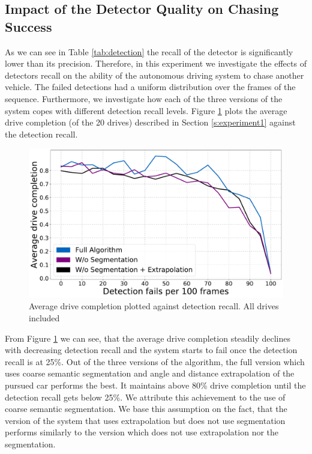 \documentclass{ctuthesis/ctuthesis}
\begin{document}
\subsection{Impact of the Detector Quality on Chasing Success}
As we can see in Table \ref{tab:detection} the recall of the detector is significantly lower than its precision. Therefore, in this experiment we investigate the effects of detectors recall on the ability of the autonomous driving system to chase another vehicle. The failed detections had a uniform distribution over the frames of the sequence. Furthermore, we investigate how each of the three versions of the system copes with different detection recall levels. Figure \ref{f:detection_recall} plots the average drive completion (of the 20 drives) described in Section \ref{s:experiment1} against the detection recall. \par


\begin{figure}[]
    \centering
    \includegraphics[width=1\textwidth]{images/recall_chart7.pdf}
    
    \caption{Average drive completion plotted against detection recall. All drives included}\label{f:detection_recall}
\end{figure}

From Figure \ref{f:detection_recall} we can see, that the average drive completion steadily declines with decreasing detection recall and the system starts to fail once the detection recall is at 25\%. Out of the three versions of the algorithm, the full version which uses coarse semantic segmentation and angle and distance extrapolation of the pursued car performs the best. It maintains above 80\% drive completion until the detection recall gets below 25\%. We attribute this achievement to the use of coarse semantic segmentation. We base this assumption on the fact, that the version of the system that uses extrapolation but does not use segmentation performs similarly to the version which does not use extrapolation nor the segmentation. \par
\end{document}

